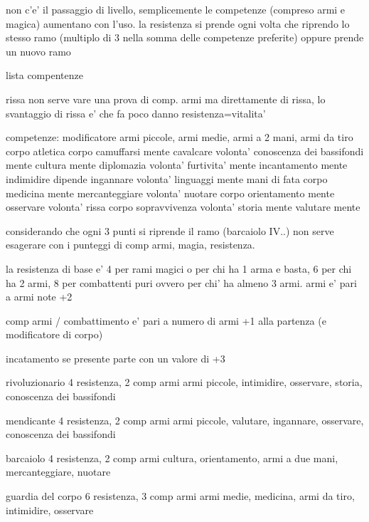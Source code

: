 \documentclass[12pt,a4paper,twoside,openany]{book}
\begin{document}
non c'e' il passaggio di livello, semplicemente le competenze (compreso armi e magica) aumentano con l'uso. la resistenza si prende ogni volta che riprendo lo stesso ramo (multiplo di 3 nella somma delle competenze preferite) oppure prende un nuovo ramo

lista compentenze

rissa non serve vare una prova di comp. armi ma direttamente di rissa, lo svantaggio di rissa e' che fa poco danno
resistenza=vitalita'



competenze:													modificatore
armi piccole, armi medie, armi a 2 mani, armi da tiro		corpo
atletica													corpo
camuffarsi													mente
cavalcare													volonta'	
conoscenza dei bassifondi									mente
cultura														mente			
diplomazia													volonta'		
furtivita'													mente	
incantamento												mente
indimidire 													dipende		
ingannare													volonta'
linguaggi													mente
mani di fata												corpo				
medicina													mente	
mercanteggiare 												volonta'		
nuotare 													corpo
orientamento												mente		
osservare													volonta'
rissa 														corpo		
sopravvivenza												volonta'
storia														mente	
valutare													mente			




considerando che ogni 3 punti si riprende il ramo (barcaiolo IV..) non serve esagerare con i punteggi di comp armi, magia, resistenza.

la resistenza di base e' 4 per rami magici o per chi ha 1 arma e basta, 6 per chi ha 2 armi, 8 per combattenti puri ovvero per chi' ha almeno 3 armi. 
armi e' pari a armi note +2

comp armi / combattimento e' pari a numero di armi +1 alla partenza (e modificatore di corpo)

incatamento se presente parte con un valore di +3

rivoluzionario  4 resistenza, 2 comp armi
armi piccole, intimidire, osservare, storia, conoscenza dei bassifondi

mendicante 4 resistenza, 2 comp armi
armi piccole, valutare, ingannare, osservare, conoscenza dei bassifondi

barcaiolo 4 resistenza, 2 comp armi
cultura, orientamento, armi a due mani,  mercanteggiare, nuotare

guardia del corpo 6 resistenza, 3 comp armi
armi medie, medicina, armi da tiro, intimidire, osservare
\end{document}
